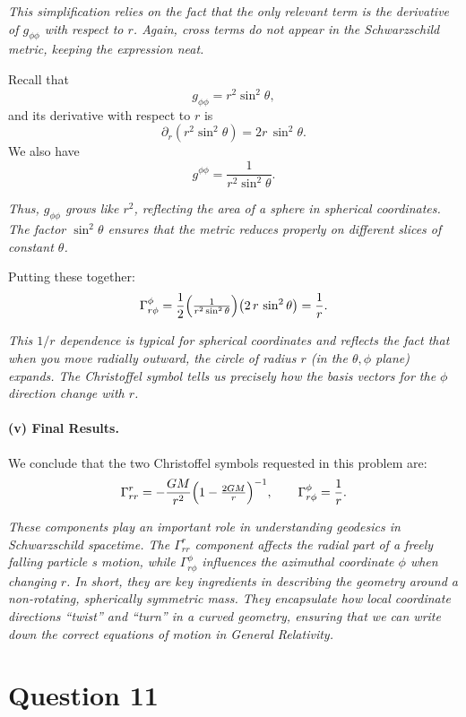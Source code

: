 \emph{This simplification relies on the fact that the only relevant term is the derivative of \(g_{\phi\phi}\) with respect to \(r\). Again, cross terms do not appear in the Schwarzschild metric, keeping the expression neat.}

\smallskip

\noindent
Recall that
\[
g_{\phi\phi} 
= 
r^2 \sin^2\theta,
\]
and its derivative with respect to \(r\) is
\[
\partial_r (r^2 \sin^2\theta) 
= 
2r \,\sin^2\theta.
\]
We also have
\[
g^{\phi\phi} 
= 
\frac{1}{r^2 \sin^2\theta}.
\]

\emph{Thus, \(g_{\phi\phi}\) grows like \(r^2\), reflecting the area of a sphere in spherical coordinates. The factor \(\sin^2\theta\) ensures that the metric reduces properly on different slices of constant \(\theta\).}

\smallskip

\noindent
Putting these together:
\[
\Gamma^\phi_{r\phi}
=
\frac{1}{2}
\Bigl(\tfrac{1}{r^2 \sin^2\theta}\Bigr)
\bigl(2\,r\,\sin^2\theta\bigr)
=
\frac{1}{r}.
\]

\emph{This \(1/r\) dependence is typical for spherical coordinates and reflects the fact that when you move radially outward, the circle of radius \(r\) (in the \(\theta,\phi\) plane) expands. The Christoffel symbol tells us precisely how the basis vectors for the \(\phi\) direction change with \(r\).}

\paragraph{(v) Final Results.}
We conclude that the two Christoffel symbols requested in this problem are:
\[
\Gamma^r_{rr}
=
-\frac{GM}{r^2}
\Bigl(1 - \tfrac{2GM}{r}\Bigr)^{-1},
\qquad
\Gamma^\phi_{r\phi}
=
\frac{1}{r}.
\]

\emph{These components play an important role in understanding geodesics in Schwarzschild spacetime. The \(\Gamma^r_{rr}\) component affects the radial part of a freely falling particle s motion, while \(\Gamma^\phi_{r\phi}\) influences the azimuthal coordinate \(\phi\) when changing \(r\). In short, they are key ingredients in describing the geometry around a non-rotating, spherically symmetric mass. They encapsulate how local coordinate directions ``twist'' and ``turn'' in a curved geometry, ensuring that we can write down the correct equations of motion in General Relativity.}

\pagebreak

\section*{Question 11}

